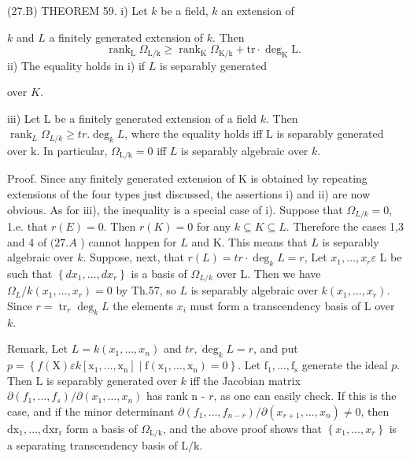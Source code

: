 (27.B) THEOREM 59. i) Let $k$ be a field, $k$ an extension of

$k$ and $L$ a finitely generated extension of $k$. Then
$$
\operatorname{rank}_{\mathrm{L}} \Omega_{\mathrm{L} / \mathrm{k}} \geqslant \operatorname{rank}_{\mathrm{K}} \Omega_{\mathrm{K} / \mathrm{k}}+\mathrm{tr} \cdot \operatorname{deg}_{\mathrm{K}} \mathrm{L} \text {. }
$$
ii) The equality holds in i) if $L$ is separably generated

over $K$.

iii) Let L be a finitely generated extension of a field $k$. Then $\operatorname{rank}_{L} \Omega_{L / k} \geqslant t r . \operatorname{deg}_{k} L$, where the equality holds iff $\mathrm{L}$ is separably generated over $\mathrm{k}$. In particular, $\Omega_{\mathrm{L} / \mathrm{k}}=0$ iff $L$ is separably algebraic over $k$.

Proof. Since any finitely generated extension of $\mathrm{K}$ is obtained by repeating extensions of the four types just discussed, the assertions i) and ii) are now obvious. As for iii), the inequality is a special case of i). Suppose that $\Omega_{L / k}=0$, 1.e. that $r(E)=0$. Then $r(K)=0$ for any $k \subseteq K \subseteq L$. Therefore the cases 1,3 and 4 of $(27 . A$ ) cannot happen for $L$ and K. This means that $L$ is separably algebraic over $k$. Suppose, next, that $r(L)=t r \cdot \operatorname{deg}_{k} L=r$, Let $x_{1}, \ldots, x_{r} \varepsilon$ L be such that $\left\{d x_{1}, \ldots, d x_{r}\right\}$ is a basis of $\Omega_{L / k}$ over L. Then we have $\Omega_{L} / k\left(x_{1}, \ldots, x_{r}\right)=0$ by Th.57, so $L$ is separably algebraic over $k\left(x_{1}, \ldots, x_{r}\right)$. Since $r=\operatorname{tr}_{r} \operatorname{deg}_{k} L$ the elements $x_{i}$ must form a transcendency basis of L over $k$.

Remark, Let $L=k\left(x_{1}, \ldots, x_{n}\right)$ and $t r, \operatorname{deg}_{k} L=r$, and put $p=\left\{f(\mathrm{X}) \varepsilon k\left[\mathrm{x}_{1}, \ldots, \mathrm{x}_{\mathrm{n}}\right] \mid \mathrm{f}\left(\mathrm{x}_{1}, \ldots, \mathrm{x}_{\mathrm{n}}\right)=0\right\}$. Let $\mathrm{f}_{1}, \ldots, \mathrm{f}_{\mathrm{s}}$ generate the ideal $p$. Then $\mathrm{L}$ is separably generated over $k$ iff the Jacobian matrix $\partial\left(f_{1}, \ldots, f_{s}\right) / \partial\left(x_{1}, \ldots, x_{n}\right)$ has rank n - $r$, as one can easily check. If this is the case, and if the minor determinant $\partial\left(f_{1}, \ldots, f_{n-r}\right) / \partial\left(x_{r+1}, \ldots, x_{n}\right) \neq 0$, then $\mathrm{dx}_{1}, \ldots, \mathrm{dx} \mathrm{r}_{\mathrm{r}}$ form a basis of $\Omega_{\mathrm{L} / \mathrm{k}}$, and the above proof shows that $\left\{x_{1}, \ldots, x_{r}\right\}$ is a separating transcendency basis of $\mathrm{L} / \mathrm{k}$.

